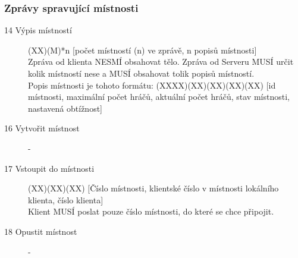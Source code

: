 \documentclass[12pt,a4paper]{article}
\begin{document}
\subsubsection*{Zprávy spravující místnosti}
\begin{description}
\item[14 Výpis místností] (XX)(M)*n [počet místností (n) ve zprávě, n popisů místnosti] \\
Zpráva od klienta NESMÍ obsahovat tělo. Zpráva od Serveru MUSÍ určit kolik místností nese a MUSÍ obsahovat tolik popisů místností. \\
Popis místnosti je tohoto formátu: (XXXX)(XX)(XX)(XX)(XX) [id místnosti, maximální počet hráčů, aktuální počet hráčů, stav místnosti, nastavená obtížnost]
\item[16 Vytvořit místnost] -
\item[17 Vstoupit do místnosti] (XX)(XX)(XX) [Číslo místnosti, klientské číslo v místnosti lokálního klienta, číslo klienta] \\ 
Klient MUSÍ poslat pouze číslo místnosti, do které se chce připojit.
\item[18 Opustit místnost] -
\end{description}
\end{document}
